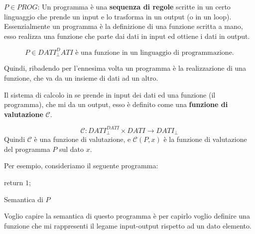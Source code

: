 \documentclass{article}
\begin{document}
\begin{figure}[H]
    \centering
\end{figure}

$P\in PROG$: Un programma è una \textbf{sequenza di regole} scritte in un certo linguaggio
che prende un input e lo trasforma in un output (o in un loop).
Essenzialmente un programma è la definizione di una funzione scritta a mano, esso
realizza una funzione che parte dai dati in input ed ottiene i dati in output.

$$P\in DATI_{\bot}^DATI\text{ è una funzione in un linguaggio di programmazione.}$$

Quindi, ribadendo per l'ennesima volta un programma è la realizzazione di una
funzione, che va da un insieme di dati ad un altro.

Il sistema di calcolo in se prende in input dei dati ed una funzione (il programma),
che mi da un output, esso è definito come una \textbf{funzione di valutazione} $\mathcal{C}$.

$$\mathcal{C}:DATI_{\bot}^{DATI}\times DATI\rightarrow DATI_{\bot}$$
Quindi $\mathcal{C}$ è una funzione di valutazione, e $\mathcal{C}(P,x)$ è la funzione di valutazione
del programma $P$ sul dato $x$.

Per esempio, consideriamo il seguente programma:

\begin{algorithm}[H]
    {
        return $1$;
    }

    \caption{Semantica di $P$}
\end{algorithm}

Voglio capire la semantica di questo programma è per capirlo voglio definire una
funzione che mi rappresenti il legame input-output rispetto ad un dato elemento.
\end{document}
